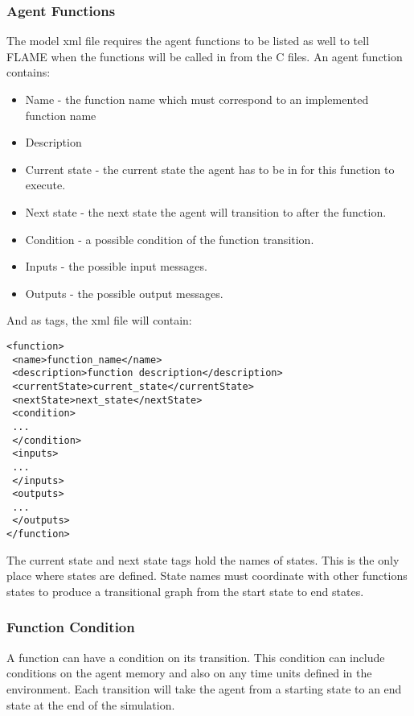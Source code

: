 \subsubsection{Agent Functions}

The model xml file requires the agent functions to be listed as well to tell FLAME when the functions will be called in from the C files. An agent function contains:

\begin{itemize}
\item Name - the function name which must correspond to an implemented function
name
\item Description
\item Current state - the current state the agent has to be in for this function to execute.
\item Next state - the next state the agent will transition to after the function.
\item Condition - a possible condition of the function transition.
\item Inputs - the possible input messages.
\item Outputs - the possible output messages.
\end{itemize}

And as tags, the xml file will contain:

\begin{mylisting}
\begin{verbatim}
<function>
 <name>function_name</name>
 <description>function description</description>
 <currentState>current_state</currentState>
 <nextState>next_state</nextState>
 <condition>
 ...
 </condition>
 <inputs>
 ...
 </inputs>
 <outputs>
 ...
 </outputs>
</function>
\end{verbatim}
\end{mylisting}

The current state and next state tags hold the names of states. This is the
only place where states are defined. State names must coordinate with other
functions states to produce a transitional graph from the start state to end
states.

\subsubsection{Function Condition}
\label{functioncond}

A function can have a condition on its transition. This condition can include
conditions on the agent memory and also on any time units defined in the
environment. Each transition will take the agent from a starting state to an end state at the end of the simulation.

